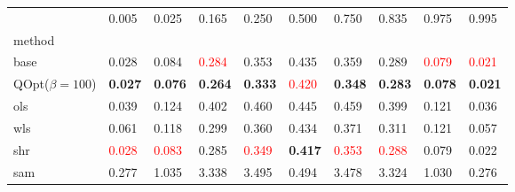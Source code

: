 \begin{tabular}{llllllllll}
\toprule
 & 0.005 & 0.025 & 0.165 & 0.250 & 0.500 & 0.750 & 0.835 & 0.975 & 0.995 \\
method &  &  &  &  &  &  &  &  &  \\
\midrule
base & 0.028 & 0.084 & \textcolor{red}{0.284} & 0.353 & 0.435 & 0.359 & 0.289 & \textcolor{red}{0.079} & \textcolor{red}{0.021} \\
\midrule
QOpt($\beta=100$) & \textbf{0.027} & \textbf{0.076} & \textbf{0.264} & \textbf{0.333} & \textcolor{red}{0.420} & \textbf{0.348} & \textbf{0.283} & \textbf{0.078} & \textbf{0.021} \\
ols & 0.039 & 0.124 & 0.402 & 0.460 & 0.445 & 0.459 & 0.399 & 0.121 & 0.036 \\
wls & 0.061 & 0.118 & 0.299 & 0.360 & 0.434 & 0.371 & 0.311 & 0.121 & 0.057 \\
shr & \textcolor{red}{0.028} & \textcolor{red}{0.083} & 0.285 & \textcolor{red}{0.349} & \textbf{0.417} & \textcolor{red}{0.353} & \textcolor{red}{0.288} & 0.079 & 0.022 \\
sam & 0.277 & 1.035 & 3.338 & 3.495 & 0.494 & 3.478 & 3.324 & 1.030 & 0.276 \\
\bottomrule
\end{tabular}